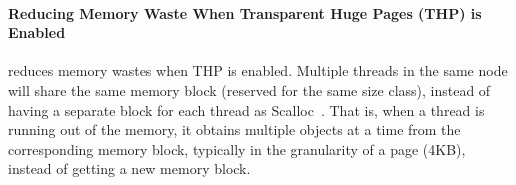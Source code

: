 \paragraph{Reducing Memory Waste When Transparent Huge Pages (THP) is Enabled} \NM{} reduces memory wastes when THP is enabled.  Multiple threads in the same node will share the same memory block (reserved for the same size class), instead of having a separate block for each thread as Scalloc~\cite{Scalloc}. That is, when a thread is running out of the memory, it obtains multiple objects at a time from the corresponding memory block, typically in the granularity of a page (4KB), instead of getting a new memory block. 





